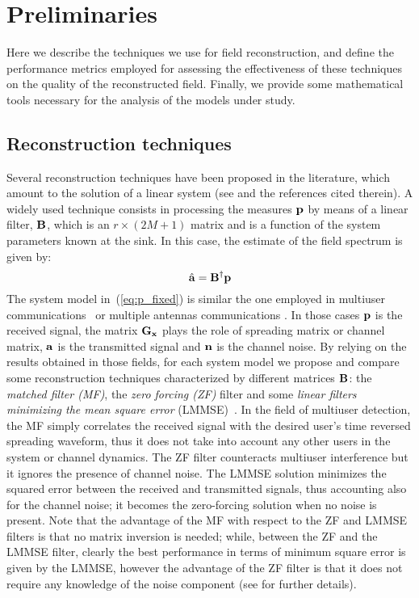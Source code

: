 \documentclass[final, a4paper]{IEEEtran}
\newcommand{\av}{{\bf a}}
\newcommand{\nv}{{\bf n}}
\newcommand{\pv}{{\bf p}}
\newcommand{\xv}{{\bf x}}
\newcommand{\Bm}{{\bf B}}
\newcommand{\Gm}{{\bf G}}
\begin{document}
\section{Preliminaries}
\label{sec:defs_perf}

Here we describe the techniques we use for field reconstruction,
and define the performance metrics employed for assessing
the effectiveness of these techniques on the quality of the reconstructed field.
Finally, we provide some mathematical tools necessary for the analysis of the
models under study.

\subsection{Reconstruction techniques}
Several reconstruction techniques have been proposed in the literature,
which  amount to the solution of a linear system
(see \cite{Feichtinger95,Grochenig99} and the references cited therein). A
widely used technique consists in processing the measures $\pv$ by means of
a linear filter,
$\Bm$, which is an $r \times (2M+1)$ matrix and is a function of the system parameters known
at the sink. In this case, the estimate of the field spectrum is given by:
\begin{equation}
\hat{\av} = \Bm\Herm\pv
\label{eq:hat_a}
\end{equation}
The system model in~(\ref{eq:p_fixed}) is similar
the one employed in multiuser communications~\cite{Verdu_book} or multiple antennas
communications \cite{TulinoVerdu,BigTarTul}.
In those cases $\pv$ is the received signal, the matrix $\Gm_\xv$ plays the role of
spreading matrix or channel matrix, $\av$ is the transmitted signal and $\nv$ is
the channel noise.
By relying on the results obtained in those fields, for each system
model we propose and compare some reconstruction techniques
characterized by different matrices $\Bm$: the {\em matched filter
(MF)}, the {\em zero forcing (ZF)} filter and some {\em linear filters
minimizing the mean square error} (LMMSE)~\cite{Verdu_book}. In the
field of multiuser detection, the MF simply correlates the received
signal with the desired user's time reversed spreading waveform,
thus it does not take into account any other users in the system or
channel dynamics. The ZF filter counteracts multiuser interference
but it ignores the presence of channel noise. The LMMSE solution
minimizes the squared error between the received and transmitted
signals, thus accounting also for the channel noise; it becomes the
zero-forcing solution when no noise is present. Note that the
advantage of the MF with respect to the ZF and LMMSE filters is that
no matrix inversion is needed; while, between the ZF and the LMMSE
filter, clearly the best performance in terms of minimum square
error is given by the LMMSE, however the advantage of the ZF filter
is that it does not require any knowledge of the noise component
(see \cite{Verdu_book} for further details).
\end{document}
